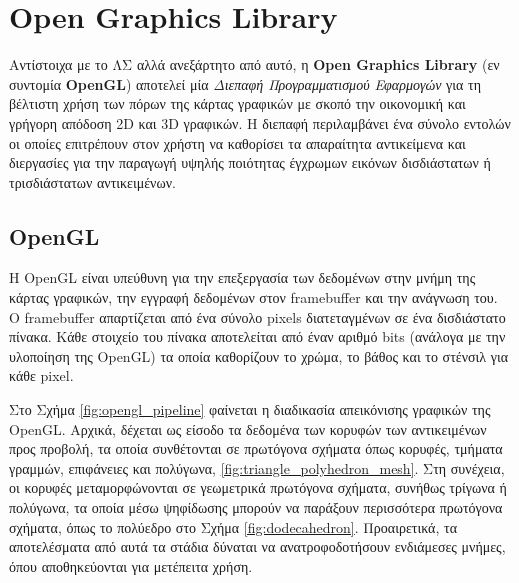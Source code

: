 \section{Open Graphics Library}
\label{sec:ogl}

Αντίστοιχα με το ΛΣ αλλά ανεξάρτητο από αυτό, η \textbf{Open Graphics Library}\cite{opengl_specification} (εν συντομία \textbf{OpenGL}) αποτελεί μία \textsl{Διεπαφή Προγραμματισμού Εφαρμογών} για τη βέλτιστη χρήση των πόρων της κάρτας γραφικών με σκοπό την οικονομική και γρήγορη απόδοση 2D και 3D γραφικών. Η διεπαφή περιλαμβάνει ένα σύνολο εντολών οι οποίες επιτρέπουν στον χρήστη να καθορίσει τα απαραίτητα αντικείμενα και διεργασίες για την παραγωγή υψηλής ποιότητας έγχρωμων εικόνων δισδιάστατων ή τρισδιάστατων αντικειμένων.

\subsection{OpenGL}
\label{section:opengl_framebuffer}
Η OpenGL είναι υπεύθυνη για την επεξεργασία των δεδομένων στην μνήμη της κάρτας γραφικών, την εγγραφή δεδομένων στον framebuffer και την ανάγνωση του. Ο framebuffer απαρτίζεται από ένα σύνολο pixels διατεταγμένων σε ένα δισδιάστατο πίνακα. Κάθε στοιχείο του πίνακα αποτελείται από έναν αριθμό bits (ανάλογα με την υλοποίηση της OpenGL) τα οποία καθορίζουν το χρώμα, το βάθος και το στένσιλ για κάθε pixel.

Στο Σχήμα \ref{fig:opengl_pipeline} φαίνεται η διαδικασία απεικόνισης γραφικών της OpenGL. Αρχικά, δέχεται ως είσοδο τα δεδομένα των κορυφών των αντικειμένων προς προβολή, τα οποία συνθέτονται σε πρωτόγονα σχήματα όπως κορυφές, τμήματα γραμμών, επιφάνειες και πολύγωνα, \ref{fig:triangle_polyhedron_mesh}. Στη συνέχεια, οι κορυφές μεταμορφώνονται σε γεωμετρικά πρωτόγονα σχήματα, συνήθως τρίγωνα ή πολύγωνα, τα οποία μέσω ψηφίδωσης μπορούν να παράξουν περισσότερα πρωτόγονα σχήματα, όπως το πολύεδρο στο Σχήμα \ref{fig:dodecahedron}. Προαιρετικά, τα αποτελέσματα από αυτά τα στάδια δύναται να ανατροφοδοτήσουν ενδιάμεσες μνήμες, όπου αποθηκεύονται για μετέπειτα χρήση.

